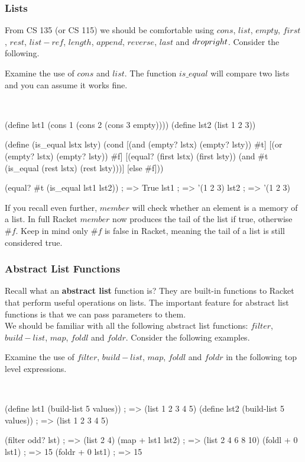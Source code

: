 \documentclass[11pt, twoside, exarticle]{article}
\newcommand{\exbox}[2] {
	\setlength{\fboxsep}{8pt}
	\marginpar {
		\vspace{0.9em}
		\footnotesize{\textbf{\color{darkpurple}EXAMPLE #1}}
	}
	\colorbox{lightpurple}{
		\begin{varwidth}{\dimexpr\linewidth-2\fboxsep}
		#2
		\end{varwidth}
	}
	~\\
}
\begin{document}
\subsubsection*{Lists}

From CS 135 (or CS 115) we should be comfortable using $cons$, $list$, $empty$, $first$, $rest$, $list-ref$, $length$, $append$, $reverse$, $last$ and $drop\-right$. Consider the following.\\

\exbox{7}{Examine the use of $cons$ and $list$. The function $is\_equal$ will compare two lists and you can assume it works fine.}

\begin{code}[Lisp]
(define lst1 (cons 1 (cons 2 (cons 3 empty))))
(define lst2 (list 1 2 3))

(define (is_equal lstx lsty)
	(cond
		[(and (empty? lstx) (empty? lsty)) #t]
		[(or (empty? lstx) (empty? lsty)) #f]
		[(equal? (first lstx) (first lsty)) (and #t (is_equal (rest lstx)
		                                                      (rest lsty)))]
		[else #f]))
	
(equal? #t (is_equal lst1 lst2)) ; => True
lst1 ; => '(1 2 3)
lst2 ; => '(1 2 3)
\end{code}

If you recall even further, $member$ will check whether an element is a memory of a list. In full Racket $member$ now produces the tail of the list if true, otherwise $\#f$. Keep in mind only $\#f$ is false in Racket, meaning the tail of a list is still considered true.

\subsubsection*{Abstract List Functions}

Recall what an \textbf{abstract list} function is? They are built-in functions to Racket that perform useful operations on lists. The important feature for abstract list functions is that we can pass parameters to them.\\

We should be familiar with all the following abstract list functions: $filter$, $build-list$, $map$, $foldl$ and $foldr$. Consider the following examples.\\

\exbox{8}{Examine the use of $filter$, $build-list$, $map$, $foldl$ and $foldr$ in the following top level expressions.}

\begin{code}[Lisp]
(define lst1 (build-list 5 values)) ; => (list 1 2 3 4 5)
(define lst2 (build-list 5 values)) ; => (list 1 2 3 4 5)

(filter odd? lst) ; => (list 2 4)
(map + lst1 lst2) ; => (list 2 4 6 8 10)
(foldl + 0 lst1) ; => 15
(foldr + 0 lst1) ; => 15
\end{code}
\end{document}
